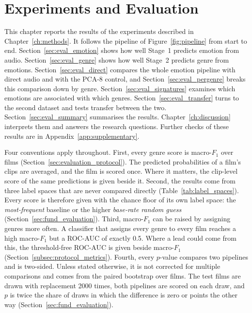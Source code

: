 \chapter{Experiments and Evaluation}
\label{ch:evaluation}

This chapter reports the results of the experiments described in Chapter~\ref{ch:methods}.
It follows the pipeline of Figure~\ref{fig:pipeline} from start to end.
Section~\ref{sec:eval_emotion} shows how well Stage~1 predicts emotion from audio.
Section~\ref{sec:eval_genre} shows how well Stage~2 predicts genre from emotions.
Section~\ref{sec:eval_direct} compares the whole emotion pipeline with direct audio and with
the PCA-8 control, and Section~\ref{sec:eval_pergenre} breaks this comparison down by
genre. Section~\ref{sec:eval_signatures} examines which emotions are associated with which genres.
Section~\ref{sec:eval_transfer} turns to the second dataset and tests transfer between
the two. Section~\ref{sec:eval_summary} summarises the results. Chapter~\ref{ch:discussion}
interprets them and answers the research questions. Further checks of
these results are in Appendix~\ref{app:supplementary}.

Four conventions apply throughout. First, every genre score is macro-$F_1$ over films
(Section~\ref{sec:evaluation_protocol}). The predicted probabilities of a film's clips are
averaged, and the film is scored once. Where it matters, the clip-level score of the same
predictions is given beside it. Second, the results come from three label spaces that are
never compared directly (Table~\ref{tab:label_spaces}). Every score is therefore given with
the chance floor of its own label space: the \emph{most-frequent} baseline or the higher
\emph{base-rate random guess} (Section~\ref{sec:fund_evaluation}). Third, macro-$F_1$ can be
raised by assigning genres more often. A classifier that assigns every genre to every film
reaches a high macro-$F_1$ but a ROC-AUC of exactly 0.5. Where a lead could come from this,
the threshold-free ROC-AUC is given beside macro-$F_1$
(Section~\ref{subsec:protocol_metrics}). Fourth, every $p$-value compares two pipelines and is two-sided. Unless stated otherwise, it is not corrected for multiple comparisons and comes from the paired bootstrap over films. The test films
are drawn with replacement 2000 times, both pipelines are scored on each draw, and $p$ is twice the share of draws in which the difference is zero or
points the other way (Section~\ref{sec:fund_evaluation}).

